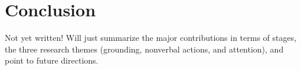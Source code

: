 \chapter{Conclusion}

Not yet written! Will just summarize the major contributions in terms of stages, the three research themes (grounding, nonverbal actions, and attention), and point to future directions.